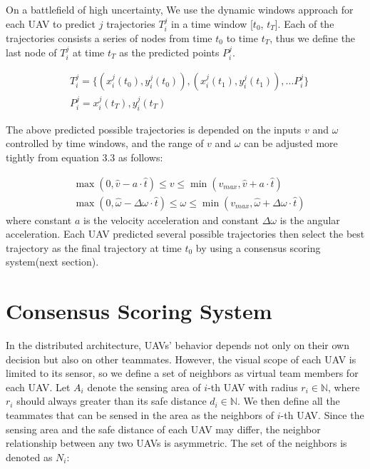 On a battlefield of high uncertainty, We use the dynamic windows approach for each UAV to predict $j$ trajectories $T^{j}_{i}$ in a time window [$t_{0}$, $t_{T}$]. Each of the trajectories consists a series of nodes from time $t_{0}$ to time $t_{T}$, thus we define the last node of $T^{j}_{i}$ at time $t_{T}$ as the predicted points $P^{j}_{i}$.

\begin{equation}
\begin{aligned}
& T^{j}_{i} = \{(x^{j}_{i}(t_{0}), y^{j}_{i}(t_{0})), (x^{j}_{i}(t_{1}), y^{j}_{i}(t_{1})),... P^{j}_{i} \} \\
& P^{j}_{i} = x^{j}_{i}(t_{T}), y^{j}_{i}(t_{T})
\end{aligned}
\end{equation}

The above predicted possible trajectories is depended on the inputs ${v}$ and ${\omega}$ controlled by time windows, and the range of ${v}$ and ${\omega}$ can be adjusted more tightly from equation 3.3 as follows:

\begin{equation}
\begin{aligned}
& \max(0, \hat v-a\cdot \hat{t})\leq v\leq \min(v_{max}, \hat v+a\cdot\hat{t})\\
& \max(0, \hat \omega-\Delta \omega\cdot \hat{t})\leq \omega\leq \min(v_{max}, \hat \omega+\Delta \omega\cdot \hat{t})
\end{aligned}
\end{equation}
where constant $a$ is the velocity acceleration and constant $\Delta\omega$ is the angular acceleration. Each UAV predicted several possible trajectories then select the best trajectory as the final trajectory at time $t_{0}$ by using a consensus scoring system(next section).


\section{Consensus Scoring System}
In the distributed architecture, UAVs' behavior depends not only on their own decision but also on other teammates. However, the visual scope of each UAV is limited to its sensor, so we define a set of neighbors as virtual team members for each UAV. Let $A_{i}$ denote the sensing area of $i$-th UAV with radius $r_{i}\in \mathbb{N}$, where $r_{i}$ should always greater than its safe distance $d_{i}\in \mathbb{N}$. We then define all the teammates that can be sensed in the area as the neighbors of $i$-th UAV. Since the sensing area and the safe distance of each UAV may differ, the neighbor relationship between any two UAVs is asymmetric. The set of the neighbors is denoted as $N_{i}$:

